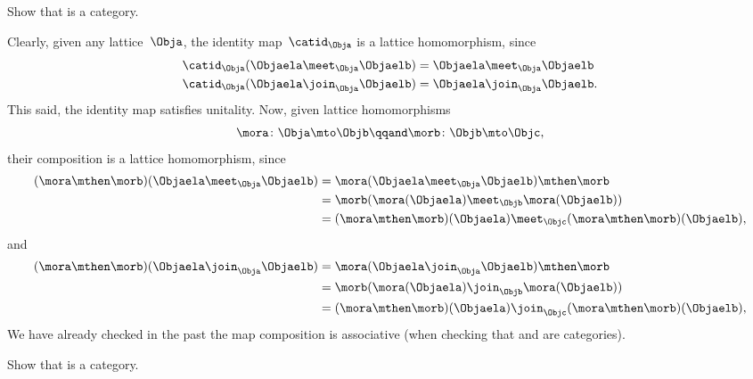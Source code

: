 \begin{exercise}
	\label{ex:lat_is_cat}
	Show that \Lat is a category.
\end{exercise}
\begin{solution}
	Clearly, given any lattice~$\Obja$, the identity map~$\catid_\Obja$ is a lattice homomorphism, since
	\begin{equation*}
		\begin{aligned}
			\catid_\Obja(\Objaela \meet_\Obja \Objaelb) & =\Objaela \meet_\Obja \Objaelb  \\
			\catid_\Obja(\Objaela \join_\Obja \Objaelb) & =\Objaela \join_\Obja \Objaelb.
		\end{aligned}
	\end{equation*}
	This said, the identity map satisfies unitality.
	Now, given lattice homomorphisms
	\begin{equation}
		\mora\colon \Obja \mto \Objb
		\qqand
		\morb\colon \Objb\mto \Objc,
	\end{equation}
	their composition is a lattice homomorphism, since
	\begin{equation*}
		\begin{aligned}
			(\mora \mthen \morb)(\Objaela \meet_\Obja \Objaelb)
			 & = \mora(\Objaela \meet_\Obja \Objaelb) \mthen \morb                         \\
			 & = \morb(\mora(\Objaela) \meet_\Objb \mora(\Objaelb))                        \\
			 & =(\mora \mthen \morb)(\Objaela) \meet_\Objc (\mora \mthen \morb)(\Objaelb),
		\end{aligned}
	\end{equation*}
	and
	\begin{equation*}
		\begin{aligned}
			(\mora \mthen \morb)(\Objaela \join_\Obja \Objaelb)
			 & = \mora(\Objaela \join_\Obja \Objaelb) \mthen \morb                         \\
			 & = \morb(\mora(\Objaela) \join_\Objb \mora(\Objaelb))                        \\
			 & =(\mora \mthen \morb)(\Objaela) \join_\Objc (\mora \mthen \morb)(\Objaelb),
		\end{aligned}
	\end{equation*}
	We have already checked in the past the map composition is associative (\eg when checking that \Set and \Pos are categories).
\end{solution}

\begin{exercise}
	\label{ex:boundlat_is_cat}
	Show that \BoundedLat is a category.
\end{exercise}

